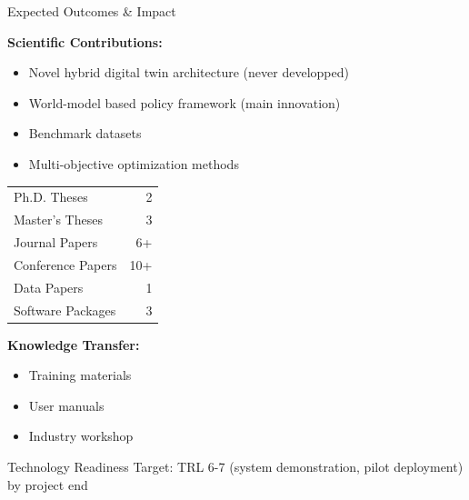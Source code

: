 \documentclass[aspectratio=169]{beamer}
\begin{document}
\begin{frame}{Expected Outcomes \& Impact}

\vspace{-0.4cm}
\textbf{Scientific Contributions:}
\begin{itemize}
    \scriptsize
    \item Novel hybrid digital twin architecture (never developped)
    \item World-model based policy framework (main innovation)
    \item Benchmark datasets
    \item Multi-objective optimization methods
\end{itemize}

\vspace{0.2cm}
\begin{table}
\tiny
\begin{tabular}{|l|r|}
\hline
Ph.D. Theses & 2 \\
Master's Theses & 3 \\
Journal Papers & 6+ \\
Conference Papers & 10+ \\
Data Papers & 1 \\
Software Packages & 3 \\
\hline
\end{tabular}
\end{table}

\vspace{0.2cm}
\textbf{Knowledge Transfer:}
\begin{itemize}
    \scriptsize
    \item Training materials
    \item User manuals
    \item Industry workshop
\end{itemize}

\vspace{0.2cm}
\begin{alertblock}{Technology Readiness}
Target: TRL 6-7 (system demonstration, pilot deployment) by project end
\end{alertblock}
\end{frame}
\end{document}
